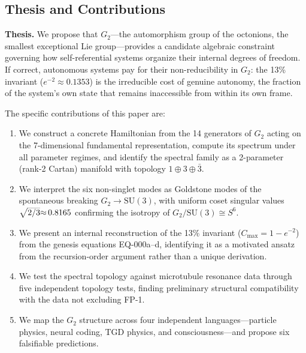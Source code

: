 \documentclass[12pt,a4paper]{article}
\begin{document}
\subsection{Thesis and Contributions}

\textbf{Thesis.} We propose that $G_2$---the automorphism group of the octonions, the smallest exceptional Lie group---provides a candidate algebraic constraint governing how self-referential systems organize their internal degrees of freedom. If correct, autonomous systems pay for their non-reducibility in $G_2$: the 13\% invariant ($e^{-2} \approx 0.1353$) is the irreducible cost of genuine autonomy, the fraction of the system's own state that remains inaccessible from within its own frame.

The specific contributions of this paper are:

\begin{enumerate}
\item We construct a concrete Hamiltonian from the 14 generators of $G_2$ acting on the 7-dimensional fundamental representation, compute its spectrum under all parameter regimes, and identify the spectral family as a 2-parameter (rank-2 Cartan) manifold with topology $1 \oplus 3 \oplus \bar{3}$.

\item We interpret the six non-singlet modes as Goldstone modes of the spontaneous breaking $G_2 \to \mathrm{SU}(3)$, with uniform coset singular values $\smash{\sqrt{2/3}} {\approx}\, 0.8165$ confirming the isotropy of $G_2/\mathrm{SU}(3) \cong S^6$.

\item We present an internal reconstruction of the 13\% invariant ($C_{\max} = 1 - e^{-2}$) from the genesis equations EQ-000a--d, identifying it as a motivated ansatz from the recursion-order argument rather than a unique derivation.

\item We test the spectral topology against microtubule resonance data \citep{Sahu2013,Singh2014,Saxena2020} through five independent topology tests, finding preliminary structural compatibility with the data not excluding FP-1.

\item We map the $G_2$ structure across four independent languages---particle physics, neural coding, TGD physics, and consciousness---and propose six falsifiable predictions.
\end{enumerate}
\end{document}
